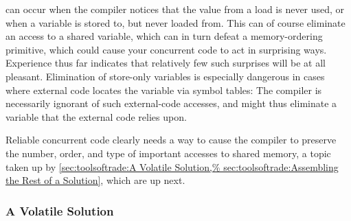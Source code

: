 \begin{description}[labelsep=.4em]
\QuickQuizEnd

\item[Dead-code elimination] can occur when the compiler notices that
the value from a load is never used, or when a variable is stored to,
but never loaded from.
This can of course eliminate an access to a shared variable, which
can in turn defeat a memory-ordering primitive, which could cause your
concurrent code to act in surprising ways.
Experience thus far indicates that relatively few such surprises will
be at all pleasant.
Elimination of store-only variables is especially dangerous in cases
where external code locates the variable via symbol tables:
The compiler is necessarily ignorant of such external-code accesses,
and might thus eliminate a variable that the external code relies upon.

\end{description}

Reliable concurrent code clearly needs a way to cause the compiler to
preserve the number, order, and type of important accesses to shared
memory, a topic taken up by
\cref{sec:toolsoftrade:A Volatile Solution,%
sec:toolsoftrade:Assembling the Rest of a Solution},
which are up next.

\subsubsection{A Volatile Solution}
\label{sec:toolsoftrade:A Volatile Solution}

